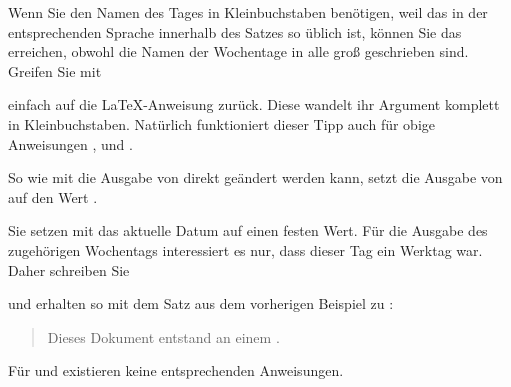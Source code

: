 \begin{Explain}
  Wenn Sie den Namen des Tages in Kleinbuchstaben benötigen,
  weil das in der entsprechenden Sprache innerhalb des Satzes so üblich ist,
  können Sie das erreichen, obwohl die Namen der Wochentage in
   alle groß geschrieben sind. Greifen Sie mit
\begin{lstcode}
  \MakeLowercase{\todaysname}
\end{lstcode}
  einfach auf die \LaTeX-Anweisung
   zurück. Diese wandelt ihr Argument
  komplett in Kleinbuchstaben. Natürlich funktioniert dieser Tipp auch für
  obige Anweisungen ,
   und
  .%
\end{Explain}%
\EndIndexGroup


\begin{Declaration}
\end{Declaration}%
So wie mit  die Ausgabe von
 direkt geändert werden kann, setzt  die Ausgabe
von  auf den Wert .
\begin{Example}
  Sie setzen mit  das aktuelle Datum auf einen
  festen Wert. Für die Ausgabe des zugehörigen Wochentags interessiert es nur,
  dass dieser Tag ein Werktag war. Daher schreiben Sie
\begin{lstcode}
\end{lstcode}
  und erhalten so mit dem Satz aus dem vorherigen Beispiel zu
  :
  \begin{quote}
    Dieses Dokument entstand an einem {\todaysname}.
  \end{quote}
\end{Example}
Für  und
 existieren keine entsprechenden
Anweisungen.%
\EndIndexGroup


